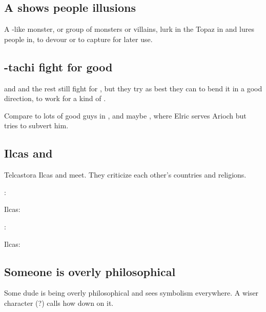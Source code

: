 \subsection{A \succubus{} shows people illusions}
\index{\succubus}%
A -like monster, or group of monsters or villains, lurk in the Topaz \Chateau{} in \Redce{} and lures people in, to devour or to capture for later use.







\subsection{\Dzasselid-tachi fight for good}
\Dzasselid{} and \Narkiza{} and the rest still fight for \Nechsain, but they try as best they can to bend it in a good direction, to work for a kind of .

Compare to lots of good guys in \cite{StevenEriksonIanCameronEsslemont:MalazanBookoftheFallen}, and maybe , where Elric serves Arioch but tries to subvert him. 







\subsection{Ilcas and \Narkiza}
Telcastora Ilcas and \Narkiza{} meet. 
They criticize each other's countries and religions. 

\begin{prose}
  \Narkiza: 
  
  Ilcas: 
  
  \Narkiza: 
  
  Ilcas: 
\end{prose}








\subsection{Someone is overly philosophical}
Some dude is being overly philosophical and sees symbolism everywhere. A wiser character (?) calls how down on it. 

